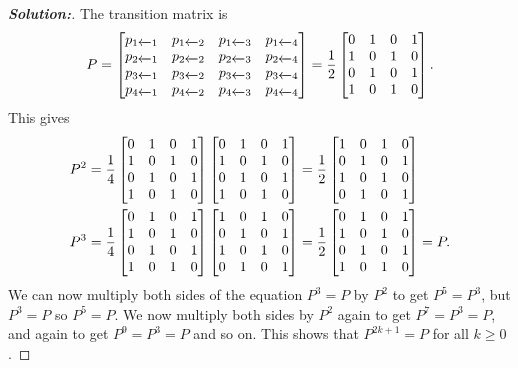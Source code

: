 \documentclass[a4paper]{amsart}
\theoremstyle{definition}
\newenvironment{solution}{\begin{proof}[\textbf{Solution:}] \vphantom{u}}{\end{proof}}
\begin{document}
\begin{solution}
 The transition matrix is
 \[ P =
     \left[\begin{matrix} 
      p_{1\xleftarrow{}1} & p_{1\xleftarrow{}2} & p_{1\xleftarrow{}3} & p_{1\xleftarrow{}4} \\
      p_{2\xleftarrow{}1} & p_{2\xleftarrow{}2} & p_{2\xleftarrow{}3} & p_{2\xleftarrow{}4} \\
      p_{3\xleftarrow{}1} & p_{3\xleftarrow{}2} & p_{3\xleftarrow{}3} & p_{3\xleftarrow{}4} \\
      p_{4\xleftarrow{}1} & p_{4\xleftarrow{}2} & p_{4\xleftarrow{}3} & p_{4\xleftarrow{}4}
     \end{matrix}\right] = 
     \frac{1}{2}
     \left[\begin{matrix} 
      0 & 1 & 0 & 1 \\
      1 & 0 & 1 & 0 \\
      0 & 1 & 0 & 1 \\
      1 & 0 & 1 & 0
     \end{matrix}\right].
 \]
 This gives
 \begin{align*}
  P^2 &= \frac{1}{4}
     \left[\begin{matrix} 
      0 & 1 & 0 & 1 \\
      1 & 0 & 1 & 0 \\
      0 & 1 & 0 & 1 \\
      1 & 0 & 1 & 0
     \end{matrix}\right]
     \left[\begin{matrix} 
      0 & 1 & 0 & 1 \\
      1 & 0 & 1 & 0 \\
      0 & 1 & 0 & 1 \\
      1 & 0 & 1 & 0
     \end{matrix}\right] 
     = \frac{1}{2} 
     \left[\begin{matrix}
      1 & 0 & 1 & 0 \\
      0 & 1 & 0 & 1 \\
      1 & 0 & 1 & 0 \\
      0 & 1 & 0 & 1
     \end{matrix}\right] \\
  P^3 &= \frac{1}{4}
     \left[\begin{matrix} 
      0 & 1 & 0 & 1 \\
      1 & 0 & 1 & 0 \\
      0 & 1 & 0 & 1 \\
      1 & 0 & 1 & 0
     \end{matrix}\right]
     \left[\begin{matrix}
      1 & 0 & 1 & 0 \\
      0 & 1 & 0 & 1 \\
      1 & 0 & 1 & 0 \\
      0 & 1 & 0 & 1
     \end{matrix}\right] 
     = \frac{1}{2}
     \left[\begin{matrix} 
      0 & 1 & 0 & 1 \\
      1 & 0 & 1 & 0 \\
      0 & 1 & 0 & 1 \\
      1 & 0 & 1 & 0
     \end{matrix}\right] = P.
 \end{align*}
 We can now multiply both sides of the equation $P^3=P$ by $P^2$ to
 get $P^5=P^3$, but $P^3=P$ so $P^5=P$.  We now multiply both sides by
 $P^2$ again to get $P^7=P^3=P$, and again to get $P^9=P^3=P$ and so
 on.  This shows that $P^{2k+1}=P$ for all $k\geq 0$.


\end{solution}
\end{document}
